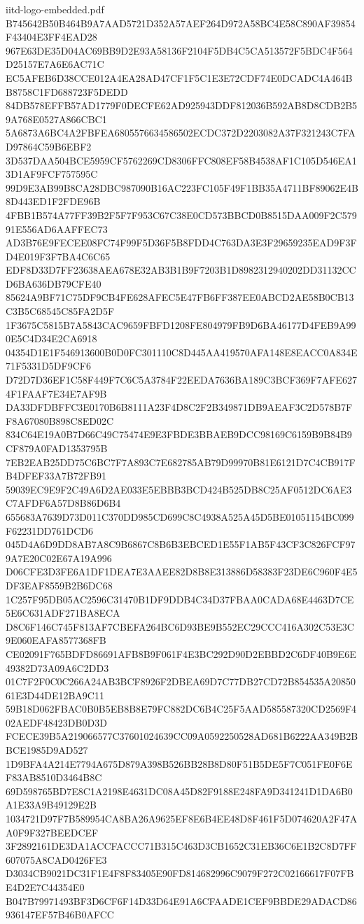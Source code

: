 \begin{filecontents*}[overwrite]{iitd-logo-embedded.pdf}
B745642B50B464B9A7AAD5721D352A57AEF264D972A58BC4E58C890AF39854F43404E3FF4EAD28
967E63DE35D04AC69BB9D2E93A58136F2104F5DB4C5CA513572F5BDC4F564D25157E7A6E6AC71C
EC5AFEB6D38CCE012A4EA28AD47CF1F5C1E3E72CDF74E0DCADC4A464BB8758C1FD688723F5DEDD
84DB578EFFB57AD1779F0DECFE62AD925943DDF812036B592AB8D8CDB2B59A768E0527A866CBC1
5A6873A6BC4A2FBFEA6805576634586502ECDC372D2203082A37F321243C7FAD97864C59B6EBF2
3D537DAA504BCE5959CF5762269CD8306FFC808EF58B4538AF1C105D546EA13D1AF9FCF757595C
99D9E3AB99B8CA28DBC987090B16AC223FC105F49F1BB35A4711BF89062E4B8D443ED1F2FDE96B
4FBB1B574A77FF39B2F5F7F953C67C38E0CD573BBCD0B8515DAA009F2C57991E556AD6AAFFEC73
AD3B76E9FECEE08FC74F99F5D36F5B8FDD4C763DA3E3F29659235EAD9F3FD4E019F3F7BA4C6C65
EDF8D33D7FF23638AEA678E32AB3B1B9F7203B1D8982312940202DD31132CCD6BA636DB79CFE40
85624A9BF71C75DF9CB4FE628AFEC5E47FB6FF387EE0ABCD2AE58B0CB13C3B5C68545C85FA2D5F
1F3675C5815B7A5843CAC9659FBFD1208FE804979FB9D6BA46177D4FEB9A990E5C4D34E2CA6918
04354D1E1F546913600B0D0FC301110C8D445AA419570AFA148E8EACC0A834E71F5331D5DF9CF6
D72D7D36EF1C58F449F7C6C5A3784F22EEDA7636BA189C3BCF369F7AFE6274F1FAAF7E34E7AF9B
DA33DFDBFFC3E0170B6B8111A23F4D8C2F2B349871DB9AEAF3C2D578B7FF8A67080B898C8ED02C
834C64E19A0B7D66C49C75474E9E3FBDE3BBAEB9DCC98169C6159B9B84B9CF879A0FAD1353795B
7EB2EAB25DD75C6BC7F7A893C7E682785AB79D99970B81E6121D7C4CB917FB4DFEF33A7B72FB91
59039EC9E9F2C49A6D2AE033E5EBBB3BCD424B525DB8C25AF0512DC6AE3C7AFDF6A57D8B86D6B4
655683A7639D73D011C370DD985CD699C8C4938A525A45D5BE01051154BC099F62231DD761DCD6
045D4A6D9DD8AB7A8C9B6867C8B6B3EBCED1E55F1AB5F43CF3C826FCF979A7E20C02E67A19A996
D06CFE3D3FE6A1DF1DEA7E3AAEE82D8B8E313886D58383F23DE6C960F4E5DF3EAF8559B2B6DC68
1C257F95DB05AC2596C31470B1DF9DDB4C34D37FBAA0CADA68E4463D7CE5E6C631ADF271BA8ECA
D8C6F146C745F813AF7CBEFA264BC6D93BE9B552EC29CCC416A302C53E3C9E060EAFA8577368FB
CE02091F765BDFD86691AFB8B9F061F4E3BC292D90D2EBBD2C6DF40B9E6E49382D73A09A6C2DD3
01C7F2F0C0C266A24AB3BCF8926F2DBEA69D7C77DB27CD72B854535A2085061E3D44DE12BA9C11
59B18D062FBAC0B0B5EB8B8E79FC882DC6B4C25F5AAD585587320CD2569F402AEDF48423DB0D3D
FCECE39B5A219066577C37601024639CC09A0592250528AD681B6222AA349B2BBCE1985D9AD527
1D9BFA4A214E7794A675D879A398B526BB28B8D80F51B5DE5F7C051FE0F6EF83AB8510D3464B8C
69D598765BD7E8C1A2198E4631DC08A45D82F9188E248FA9D341241D1DA6B0A1E33A9B49129E2B
1034721D97F7B589954CA8BA26A9625EF8E6B4EE48D8F461F5D074620A2F47AA0F9F327BEEDCEF
3F2892161DE3DA1ACCFACCC71B315C463D3CB1652C31EB36C6E1B2C8D7FF607075A8CAD0426FE3
D3034CB9021DC31F1E4F8F83405E90FD814682996C9079F272C02166617F07FBE4D2E7C44354E0
B047B79971493BF3D6CF6F14D33D64E91A6CFAADE1CEF9BBDE29ADACD86936147EF57B46B0AFCC

\end{filecontents*}
